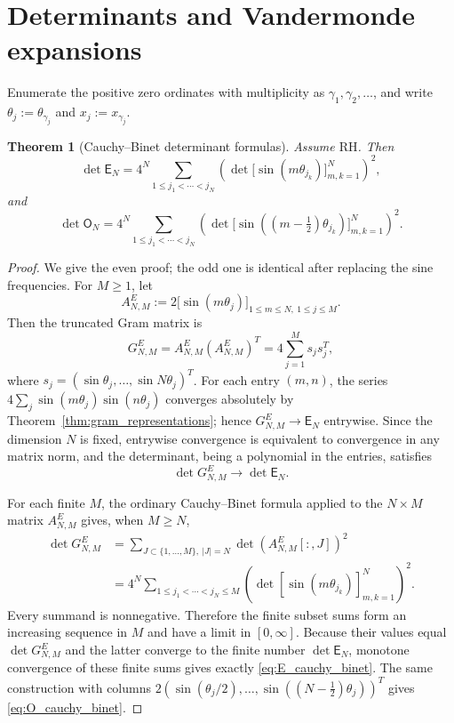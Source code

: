 \documentclass[11pt]{amsart}
\numberwithin{equation}{section}
\theoremstyle{plain}
\newtheorem{theorem}{Theorem}[section]
\theoremstyle{definition}
\theoremstyle{remark}
\newcommand{\RH}{\mathrm{RH}}
\newcommand{\E}{\mathsf E}
\newcommand{\Omat}{\mathsf O}
\begin{document}
\section{Determinants and Vandermonde expansions}
\label{sec:determinants}

Enumerate the positive zero ordinates with multiplicity as $\gamma_1,\gamma_2,\ldots$, and write $\theta_j:=\theta_{\gamma_j}$ and $x_j:=x_{\gamma_j}$.

\begin{theorem}[Cauchy--Binet determinant formulas]
\label{thm:cauchy_binet_determinants}
Assume $\RH$. Then
\begin{equation}
\det\E_N
=4^N
\sum_{1\le j_1<\cdots<j_N}
\left(\det\bigl[\sin(m\theta_{j_k})\bigr]_{m,k=1}^N\right)^2,
\label{eq:E_cauchy_binet}
\end{equation}
and
\begin{equation}
\det\Omat_N
=4^N
\sum_{1\le j_1<\cdots<j_N}
\left(\det\bigl[\sin((m-\tfrac12)\theta_{j_k})\bigr]_{m,k=1}^N\right)^2.
\label{eq:O_cauchy_binet}
\end{equation}
\end{theorem}

\begin{proof}
We give the even proof; the odd one is identical after replacing the sine frequencies.  For $M\ge1$, let
\begin{equation}
A_{N,M}^E:=2\bigl[\sin(m\theta_j)\bigr]_{1\le m\le N,\ 1\le j\le M}.
\end{equation}
Then the truncated Gram matrix is
\begin{equation}
G_{N,M}^E=A_{N,M}^E(A_{N,M}^E)^T
=4\sum_{j=1}^{M}s_j s_j^T,
\end{equation}
where $s_j=(\sin\theta_j,\ldots,\sin N\theta_j)^T$.  For each entry $(m,n)$, the series
$4\sum_j\sin(m\theta_j)\sin(n\theta_j)$ converges absolutely by Theorem~\ref{thm:gram_representations}; hence $G_{N,M}^E\to\E_N$ entrywise.  Since the dimension $N$ is fixed, entrywise convergence is equivalent to convergence in any matrix norm, and the determinant, being a polynomial in the entries, satisfies
\begin{equation}
\det G_{N,M}^E\longrightarrow\det\E_N.
\end{equation}

For each finite $M$, the ordinary Cauchy--Binet formula applied to the $N\times M$ matrix $A_{N,M}^E$ gives, when $M\ge N$,
\begin{align}
\det G_{N,M}^E
&=\sum_{J\subset\{1,\ldots,M\},\ |J|=N}\det(A_{N,M}^E[:,J])^2\\
&=4^N\sum_{1\le j_1<\cdots<j_N\le M}
\left(\det[\sin(m\theta_{j_k})]_{m,k=1}^{N}\right)^2.
\end{align}
Every summand is nonnegative.  Therefore the finite subset sums form an increasing sequence in $M$ and have a limit in $[0,\infty]$.  Because their values equal $\det G_{N,M}^E$ and the latter converge to the finite number $\det\E_N$, monotone convergence of these finite sums gives exactly \eqref{eq:E_cauchy_binet}.  The same construction with columns
$2(\sin(\theta_j/2),\ldots,\sin((N-\tfrac12)\theta_j))^T$ gives \eqref{eq:O_cauchy_binet}.
\end{proof}
\end{document}
